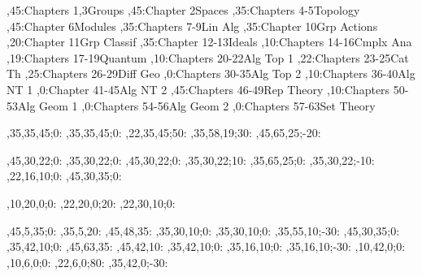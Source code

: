 
\setcounter{diagheight}{50}
\begin{chart}
,45:{Chapters 1,3}{Groups}{}
,45:{Chapter 2}{Spaces}{}
,35:{Chapters 4-5}{Topology}{}
,45:{Chapter 6}{Modules}{}
,35:{Chapters 7-9}{Lin Alg}{}
,35:{Chapter 10}{Grp Actions}{}
,20:{Chapter 11}{Grp Classif}{}
,35:{Chapter 12-13}{Ideals}{}
,10:{Chapters 14-16}{Cmplx Ana}{}
,19:{Chapters 17-19}{Quantum}{}
,10:{Chapters 20-22}{Alg Top 1}{}
,22:{Chapters 23-25}{Cat Th}{}
,25:{Chapters 26-29}{Diff Geo}{}
,0:{Chapters 30-35}{Alg Top 2}{}
,10:{Chapters 36-40}{Alg NT 1}{}
,0:{Chapter 41-45}{Alg NT 2}{}
,45:{Chapters 46-49}{Rep Theory}{}
,10:{Chapters 50-53}{Alg Geom 1}{}
,0:{Chapters 54-56}{Alg Geom 2}{}
,0:{Chapters 57-63}{Set Theory}{}

,35,35,45;0:   %
,35,35,45;0:   %
,22,35,45;50: %
,35,58,19;30:  %
,45,65,25;-20: %

,45,30,22;0:   %
,35,30,22;0:   %
,45,30,22;0:   %
,35,30,22;10:  %
,35,65,25;0:   %
,35,30,22;-10: %
,22,16,10;0:   %
,45,30,35;0:   %

,10,20,0;0:    %
,22,20,0;20:   %
,22,30,10;0:   %

,45,5,35;0:    %
,35,5,20:      %
,45,48,35:     %
,35,30,10;0:   %
,35,30,10;0:   %
,35,55,10;-30: %
,45,30,35;0:   %
,35,42,10;0:   %
,45,63,35:     %
,45,42,10:     %
,35,42,10;0:   %
,35,16,10;0:   %
,35,16,10;-30: %
,10,42,0;0:    %
,10,6,0;0:     %
,22,6,0;80:     %
,35,42,0;-30:  %
\end{chart}
